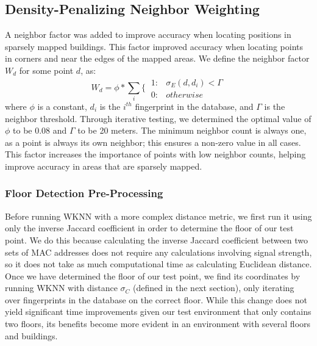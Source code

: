\documentclass[conference]{IEEEtran}
\begin{document}
\subsection{Density-Penalizing Neighbor Weighting}
\indent A neighbor factor was added to improve accuracy when locating positions in sparsely mapped buildings. This factor improved accuracy when locating points in corners and near the edges of the mapped areas. We define the neighbor factor $W_d$ for some point $d$, as:
\begin{equation}
\label{density}
W_d=\phi*\sum\limits_{i}\{\
\begin{array}{lr}
       1: &  \sigma_E(d, d_i) < \Gamma \\
       0: &  otherwise
\end{array}
\end{equation}
\indent where $\phi$ is a constant, $d_i$ is the $i^{th}$ fingerprint in the database, and $\Gamma$ is the neighbor threshold. Through iterative testing, we determined the optimal value of $\phi$ to be 0.08 and $\Gamma$ to be 20 meters. The minimum neighbor count is always one, as a point is always its own neighbor; this ensures a non-zero value in all cases. This factor increases the importance of points with low neighbor counts, helping improve accuracy in areas that are sparsely mapped. 

\subsubsection{Floor Detection Pre-Processing}
\indent Before running WKNN with a more complex distance metric, we first run it using only the inverse Jaccard coefficient in order to determine the floor of our test point. We do this because calculating the inverse Jaccard coefficient between two sets of MAC addresses does not require any calculations involving signal strength, so it does not take as much computational time as calculating Euclidean distance. Once we have determined the floor of our test point, we find its coordinates by running WKNN with distance $\sigma_C$ (defined in the next section), only iterating over fingerprints in the database on the correct floor. While this change does not yield significant time improvements given our test environment that only contains two floors, its benefits become more evident in an environment with several floors and buildings.
\end{document}
